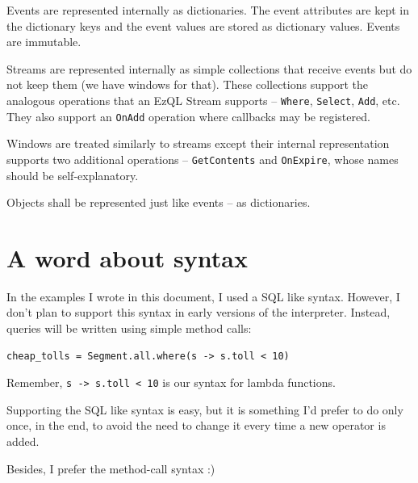 \documentclass{report}
\begin{document}
Events are represented internally as dictionaries. The event
attributes are kept in the dictionary keys and the event values are
stored as dictionary values. Events are immutable.

Streams are represented internally as simple collections that receive
events but do not keep them (we have windows for that). These
collections support the analogous operations that an EzQL Stream
supports -- \verb=Where=, \verb=Select=, \verb=Add=, etc. They also
support an \verb=OnAdd= operation where callbacks may be registered.

Windows are treated similarly to streams except their internal
representation supports two additional operations --
\verb=GetContents= and \verb=OnExpire=, whose names should be
self-explanatory.

Objects shall be represented just like events -- as dictionaries.


\chapter{A word about syntax}

In the examples I wrote in this document, I used a SQL like
syntax. However, I don't plan to support this syntax in early versions
of the interpreter. Instead, queries will be written using simple
method calls:

\begin{verbatim}
cheap_tolls = Segment.all.where(s -> s.toll < 10)
\end{verbatim}

Remember, \verb=s -> s.toll < 10= is our syntax for lambda
functions.

Supporting the SQL like syntax is easy, but it is something I'd prefer
to do only once, in the end, to avoid the need to change it every time
a new operator is added.

Besides, I prefer the method-call syntax :)
\end{document}
